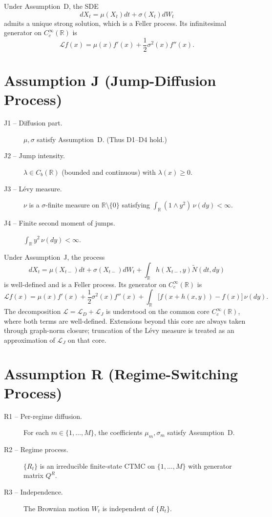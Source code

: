 \documentclass[11pt,a4paper,openany]{book}
\theoremstyle{definition}
\theoremstyle{plain}
\theoremstyle{remark}
\newcommand{\1}{\mathbbm{1}}
\newcommand{\R}{\mathbb{R}}
\begin{document}
\noindent Under Assumption~D, the SDE
\[
dX_{t} = \mu(X_{t}) dt + \sigma(X_{t}) dW_{t}
\]
admits a unique strong solution, which is a Feller process. Its infinitesimal generator on $C_{c}^{\infty}(\R)$ is
\[
\mathcal{L} f(x) = \mu(x) f'(x) + \frac{1}{2} \sigma^{2}(x) f''(x).
\]

\section{Assumption J (Jump-Diffusion Process)}

\begin{description}
    \item[J1 -- Diffusion part.] $\mu, \sigma$ satisfy Assumption~D. (Thus D1--D4 hold.)
    \item[J2 -- Jump intensity.] $\lambda \in C_{b}(\R)$ (bounded and continuous) with $\lambda(x) \geq 0$.
    \item[J3 -- L\'{e}vy measure.] $\nu$ is a $\sigma$-finite measure on $\R \setminus \{0\}$ satisfying $\int_{\R} (1 \wedge y^{2}) \, \nu(dy) < \infty$.
    \item[J4 -- Finite second moment of jumps.] $\int_{\R} y^{2} \, \nu(dy) < \infty$.
\end{description}

\noindent Under Assumption~J, the process
\[
dX_{t} = \mu(X_{t-}) dt + \sigma(X_{t-}) dW_{t} + \int_{\R} h(X_{t-}, y) \widetilde{N}(dt, dy)
\]
is well-defined and is a Feller process. Its generator on $C_{c}^{\infty}(\R)$ is
\[
\mathcal{L} f(x) = \mu(x) f'(x) + \frac{1}{2} \sigma^{2}(x) f''(x) + \int_{\R} \bigl[f(x + h(x,y)) - f(x)\bigr] \, \nu(dy).
\]
The decomposition $\mathcal{L}=\mathcal{L}_{D}+\mathcal{L}_{J}$ is understood on the common core $C_c^\infty(\R)$, where both terms are well-defined. Extensions beyond this core are always taken through graph-norm closure; truncation of the L\'{e}vy measure is treated as an approximation of $\mathcal{L}_{J}$ on that core.

\section{Assumption R (Regime-Switching Process)}

\begin{description}
    \item[R1 -- Per-regime diffusion.] For each $m \in \{1,\ldots,M\}$, the coefficients $\mu_{m}, \sigma_{m}$ satisfy Assumption~D.
    \item[R2 -- Regime process.] $\{R_{t}\}$ is an irreducible finite-state CTMC on $\{1,\ldots,M\}$ with generator matrix $Q^{R}$.
    \item[R3 -- Independence.] The Brownian motion $W_{t}$ is independent of $\{R_{t}\}$.
\end{description}
\end{document}
